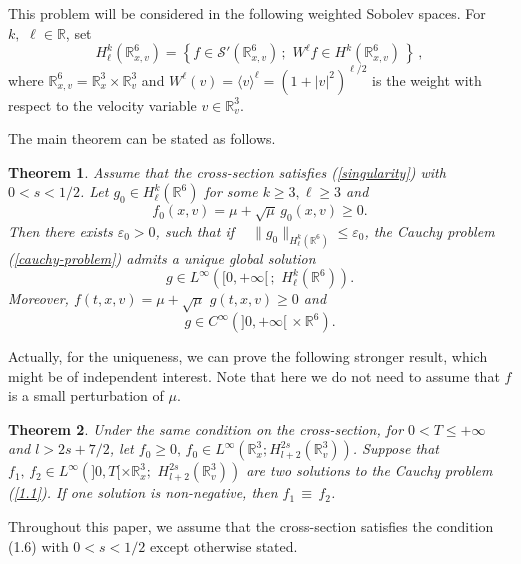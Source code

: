 \documentclass{amsart}[12pt, article]
\newtheorem{theo}{Theorem}[section]
\begin{document}
This problem will be considered in the following
weighted Sobolev spaces.
For
$k,\,\,\ell\in{{{\mathbb R}}}$, set
$$
H^k_\ell({{{\mathbb R}}}^6_{x, v})=\left\{f\in{{\mathcal S}}'({{{\mathbb R}}}^6_{x, v})\, ;\,\, W^\ell
f\in H^k({{{\mathbb R}}}^6_{x, v})\,\right\}\, ,
$$
where ${{{\mathbb R}}}^6_{x, v}={{{\mathbb R}}}^3_{x}\times {{{\mathbb R}}}^3_{v}$ and $ W^\ell
(v)=\langle v\rangle^\ell=(1+|v|^2)^{\ell/2}$ is the weight with respect to the
velocity variable $v\in{{{\mathbb R}}}^3_v$.

The main theorem can be
stated as follows.

\begin{theo}\label{theo1}
Assume that the cross-section satisfies (\ref{singularity}) with
$0<s<1/2$. Let $ g_0 \in H^{k}_\ell({{{\mathbb R}}}^6)$ for some $
k\geq 3, \ell\geq 3$ and
$$
f_0(x, v)=\mu+\sqrt{\mu} \,g_0(x, v)\geq 0.
$$
Then there exists $\varepsilon_0 >0$, such that if ~
$\|g_0\|_{H^{k}_\ell({{{\mathbb R}}}^6)}\leq \varepsilon_0$,  the Cauchy problem
(\ref{cauchy-problem}) admits a unique global solution $$g\in
L^\infty([0, +\infty[\,;\,\,H^{k}_\ell({{{\mathbb R}}}^6)).$$ Moreover,
$f(t, x,
v)=\mu+\sqrt{\mu}\,\, g(t, x, v)\geq 0$ and
$$
g\in C^\infty(]0, +\infty[\,\times{{{\mathbb R}}}^6).
$$
\end{theo}

Actually, for the uniqueness, we can prove the following stronger result, which might be  of independent interest. Note that here we do not need to assume that $f$ is a small
perturbation of $\mu$.

\begin{theo}\label{theo2}
Under the same condition on the cross-section, for $ 0<T\leq +\infty$ and $
 l>2s+7/2$, let $f_0\geq 0, \, f_0\in
L^\infty({{{\mathbb R}}}_x^3; H^{2s}_{l+2}({{{\mathbb R}}}^3_v))$. Suppose that $f_1,\, f_2\in
 L^\infty(]0, T[ \times {{{\mathbb R}}}_x^3;\,\, H^{2s}_{l+2}({{{\mathbb R}}}_v^3))$
are two solutions to the Cauchy problem
(\ref{1.1}).
If one solution is non-negative, then  $f_1\,\equiv\, f_2$.
\end{theo}

Throughout this paper, we assume that the cross-section satisfies
the condition (1.6) with $0<s<1/2$ except otherwise stated.
\end{document}
